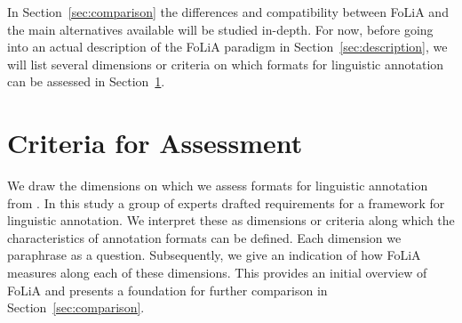 \documentclass[a4paper,10pt,twoside]{article}
\begin{document}
In Section~\ref{sec:comparison} the differences and compatibility between FoLiA
and the main alternatives available will be studied in-depth. For now, before
going into an actual description of the FoLiA paradigm in
Section~\ref{sec:description}, we will list
several dimensions or criteria on which formats for linguistic annotation can
be assessed in Section~\ref{sec:criteria}.

\section{Criteria for Assessment}
\label{sec:criteria}

We draw the dimensions on which we assess formats for linguistic annotation
from . In this study a group of experts drafted requirements
for a framework for linguistic annotation. We interpret these as dimensions or
criteria along which the characteristics of annotation formats can be defined.
Each dimension we paraphrase as a question. Subsequently, we give an indication
of how FoLiA measures along each of these dimensions. This provides an initial
overview of FoLiA and presents a foundation for further comparison in
Section~\ref{sec:comparison}.
\end{document}
